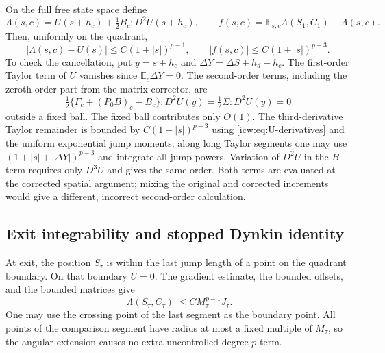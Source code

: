 \documentclass[11pt,letterpaper]{article}
\theoremstyle{remark}\newtheorem{remark}[theorem]{Remark}
\newcommand{\E}{\mathbb E}
\newcommand{\1}{\mathbf1}
\begin{document}
On the full free state space define
\begin{equation}\label{icw:eq:Lambda}
 \Lambda(s,c)=U(s+h_c)+\tfrac12B_c:D^2U(s+h_c),\qquad
 f(s,c)=\E_{s,c}\Lambda(S_1,C_1)-\Lambda(s,c).
\end{equation}
Then, uniformly on the quadrant,
\begin{equation}\label{icw:eq:defect}
 |\Lambda(s,c)-U(s)|\le C(1+|s|)^{p-1},\qquad
 |f(s,c)|\le C(1+|s|)^{p-3}.
\end{equation}
To check the cancellation, put $y=s+h_c$ and
$\Delta Y=\Delta S+h_d-h_c$. The first-order Taylor term of $U$
vanishes since $\E_c\Delta Y=0$. The second-order terms, including
the zeroth-order part from the matrix corrector, are
\[
 \tfrac12\{\Gamma_c+(P_0B)_c-B_c\}:D^2U(y)
 =\tfrac12\Sigma:D^2U(y)=0
\]
outside a fixed ball. The fixed ball contributes only $O(1)$.
The third-derivative Taylor remainder is bounded by
$C(1+|s|)^{p-3}$ using \eqref{icw:eq:U-derivatives} and the uniform
exponential jump moments; along long Taylor segments one may use
$(1+|s|+|\Delta Y|)^{p-3}$ and integrate all jump powers.
Variation of $D^2U$ in the $B$ term requires only $D^3U$ and gives the
same order. Both terms are evaluated at the corrected spatial argument;
mixing the original and corrected increments would give a different,
incorrect second-order calculation.

\subsection{Exit integrability and stopped Dynkin identity}
At exit, the position $S_\tau$ is within the last jump length of a point
on the quadrant boundary. On that boundary $U=0$. The gradient estimate,
the bounded offsets, and the bounded matrices give
\begin{equation}\label{icw:eq:exit-Lambda}
 |\Lambda(S_\tau,C_\tau)|\le C M_\tau^{p-1}J_\tau.
\end{equation}
One may use the crossing point of the last segment as the boundary
point. All points of the comparison segment have radius at most a fixed
multiple of $M_\tau$, so the angular extension causes no extra
uncontrolled degree-$p$ term.
\end{document}
